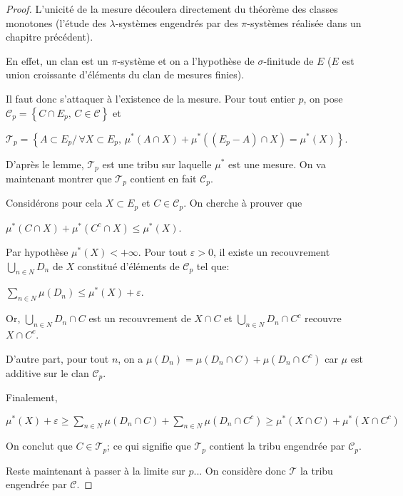 \begin{proof}
L'unicité de la mesure découlera directement du théorème des classes monotones (l'étude des $\lambda$-systèmes engendrés par des $\pi$-systèmes réalisée dans un chapitre précédent). 

En effet, un clan est un $\pi$-système et on a l'hypothèse de $\sigma$-finitude de $E$ ($E$ est union croissante d'éléments du clan de mesures finies).

Il faut donc s'attaquer à l'existence de la mesure.
Pour tout entier $p$, on pose $\mathcal{C}_p = \left \{ C \cap E_p, \, C \in \mathcal{C}\right \}$ et  

$\mathcal{T}_p = \left \{ A \subset E_p/ \, \forall X \subset E_p, \, \mu^{*}(A \cap X)+\mu^{*}\left(\left(E_p-A\right) \cap X\right) = \mu^{*}(X)\right \}$.

D'après le lemme, $\mathcal{T}_p$ est une tribu sur laquelle $\mu^{*}$ est une mesure. 
On va maintenant montrer que $\mathcal{T}_p$ contient en fait $\mathcal{C}_p$.

Considérons pour cela $X \subset E_p$ et $C \in \mathcal{C}_p$. On cherche à prouver que 

$\mu^{*}(C \cap X)+\mu^{*}(C^c \cap X) \leq \mu^{*}(X)$. 

Par hypothèse $\mu^{*}(X)<+\infty$. 
Pour tout $\varepsilon > 0$, il existe un recouvrement $\bigcup \limits_{n \in N} D_n$ de $X$ constitué d'éléments de $\mathcal{C}_p$ tel que:

$\displaystyle{\sum \limits_{n \in N}} \mu(D_n) \leq \mu^{*}(X)+\varepsilon$.

Or, $\bigcup \limits_{n \in N} D_n \cap C$ est un recouvrement de $X \cap C$ et $\bigcup \limits_{n \in N} D_n \cap C^c$ recouvre $X \cap C^c$.

D'autre part, pour tout $n$, on a $\mu(D_n) = \mu(D_n \cap C) + \mu(D_n \cap C^c)$ car $\mu$ est additive sur le clan $\mathcal{C}_p$.

Finalement, 

$
\mu^{*}(X)+\varepsilon \geq \displaystyle{\sum \limits_{n \in N}} \mu(D_n \cap C) + \displaystyle{\sum \limits_{n \in N}} \mu(D_n \cap C^c) \geq \mu^{*}(X \cap C) + \mu^{*}(X \cap C^c)
$

On conclut que $C \in \mathcal{T}_p$; ce qui signifie que $\mathcal{T}_p$ contient la tribu engendrée par $\mathcal{C}_p$.

Reste maintenant à passer à la limite sur $p$...
On considère donc $\mathcal{T}$ la tribu engendrée par $\mathcal{C}$.


\end{proof}
